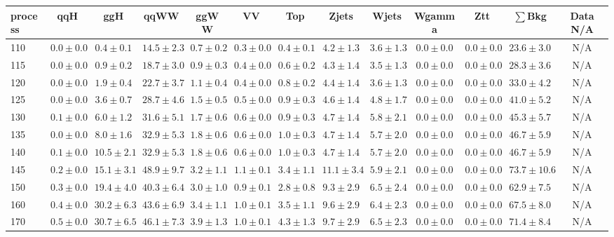 \begin{table}
{%
 \tiny
 \begin{center}
 \begin{tabular}{l | c c | c c c c c c c c  | c c}
 \hline
 process & qqH & ggH & qqWW & ggWW & VV & Top & Zjets & Wjets & Wgamma & Ztt & $\sum$Bkg & Data N/A \\
 \hline
110 & $0.0\pm0.0$ & $0.4\pm0.1$ & $14.5\pm2.3$ & $0.7\pm0.2$ & $0.3\pm0.0$ & $0.4\pm0.1$ & $4.2\pm1.3$ & $3.6\pm1.3$ & $0.0\pm0.0$ & $0.0\pm0.0$ & $23.6\pm3.0$ &  N/A \\
115 & $0.0\pm0.0$ & $0.9\pm0.2$ & $18.7\pm3.0$ & $0.9\pm0.3$ & $0.4\pm0.0$ & $0.6\pm0.2$ & $4.3\pm1.4$ & $3.5\pm1.3$ & $0.0\pm0.0$ & $0.0\pm0.0$ & $28.3\pm3.6$ &  N/A \\
120 & $0.0\pm0.0$ & $1.9\pm0.4$ & $22.7\pm3.7$ & $1.1\pm0.4$ & $0.4\pm0.0$ & $0.8\pm0.2$ & $4.4\pm1.4$ & $3.6\pm1.3$ & $0.0\pm0.0$ & $0.0\pm0.0$ & $33.0\pm4.2$ &  N/A \\
125 & $0.0\pm0.0$ & $3.6\pm0.7$ & $28.7\pm4.6$ & $1.5\pm0.5$ & $0.5\pm0.0$ & $0.9\pm0.3$ & $4.6\pm1.4$ & $4.8\pm1.7$ & $0.0\pm0.0$ & $0.0\pm0.0$ & $41.0\pm5.2$ &  N/A \\
130 & $0.1\pm0.0$ & $6.0\pm1.2$ & $31.6\pm5.1$ & $1.7\pm0.6$ & $0.6\pm0.0$ & $0.9\pm0.3$ & $4.7\pm1.4$ & $5.8\pm2.1$ & $0.0\pm0.0$ & $0.0\pm0.0$ & $45.3\pm5.7$ &  N/A \\
135 & $0.0\pm0.0$ & $8.0\pm1.6$ & $32.9\pm5.3$ & $1.8\pm0.6$ & $0.6\pm0.0$ & $1.0\pm0.3$ & $4.7\pm1.4$ & $5.7\pm2.0$ & $0.0\pm0.0$ & $0.0\pm0.0$ & $46.7\pm5.9$ &  N/A \\
140 & $0.1\pm0.0$ & $10.5\pm2.1$ & $32.9\pm5.3$ & $1.8\pm0.6$ & $0.6\pm0.0$ & $1.0\pm0.3$ & $4.7\pm1.4$ & $5.7\pm2.0$ & $0.0\pm0.0$ & $0.0\pm0.0$ & $46.7\pm5.9$ &  N/A \\
145 & $0.2\pm0.0$ & $15.1\pm3.1$ & $48.9\pm9.7$ & $3.2\pm1.1$ & $1.1\pm0.1$ & $3.4\pm1.1$ & $11.1\pm3.4$ & $5.9\pm2.1$ & $0.0\pm0.0$ & $0.0\pm0.0$ & $73.7\pm10.6$ &  N/A \\
150 & $0.3\pm0.0$ & $19.4\pm4.0$ & $40.3\pm6.4$ & $3.0\pm1.0$ & $0.9\pm0.1$ & $2.8\pm0.8$ & $9.3\pm2.9$ & $6.5\pm2.4$ & $0.0\pm0.0$ & $0.0\pm0.0$ & $62.9\pm7.5$ & N/A \\
160 & $0.4\pm0.0$ & $30.2\pm6.3$ & $43.6\pm6.9$ & $3.4\pm1.1$ & $1.0\pm0.1$ & $3.5\pm1.1$ & $9.6\pm2.9$ & $6.4\pm2.3$ & $0.0\pm0.0$ & $0.0\pm0.0$ & $67.5\pm8.0$ & N/A \\
170 & $0.5\pm0.0$ & $30.7\pm6.5$ & $46.1\pm7.3$ & $3.9\pm1.3$ & $1.0\pm0.1$ & $4.3\pm1.3$ & $9.7\pm2.9$ & $6.5\pm2.3$ & $0.0\pm0.0$ & $0.0\pm0.0$ & $71.4\pm8.4$ & N/A \\

\end{tabular}
\end{center}}
\end{table}
